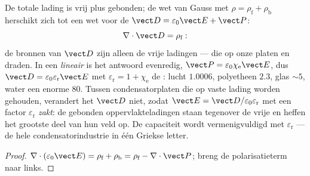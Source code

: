 \begin{proposition}\label{prop:b3:electromagnetism-in-matter:displacement}
De totale lading is vrij plus gebonden; de wet van Gauss met $\rho =
\rho_{\text{f}} + \rho_{\text{b}}$ herschikt zich tot een wet voor de
\emph{} $\vect D = \varepsilon_0\vect E +
\vect P$:
\[
\nabla\cdot\vect D = \rho_{\text{f}} :
\]
de bronnen van $\vect D$ zijn alleen de vrije ladingen --- die op onze
platen en draden. In een \emph{lineair}  is het antwoord
evenredig, $\vect P = \varepsilon_0\chi_{\text{e}}\vect E$, dus
$\vect D = \varepsilon_0\varepsilon_{\text{r}}\vect E$ met
$\varepsilon_{\text{r}} = 1 + \chi_{\text{e}}$ de \emph{}: lucht $1.0006$, polyetheen $2.3$, glas $\sim 5$,
water een enorme $80$. Tussen condensatorplaten die op vaste lading
worden gehouden, verandert het  $\vect D$ niet, zodat $\vect E =
\vect D/\varepsilon_0\varepsilon_{\text{r}}$ met een factor
$\varepsilon_{\text{r}}$ \emph{zakt}: de gebonden oppervlakteladingen staan tegenover
de vrije en heffen het grootste deel van hun veld op. De capaciteit wordt vermenigvuldigd met
$\varepsilon_{\text{r}}$ --- de hele condensatorindustrie in één
Griekse letter.
\end{proposition}

\begin{proof}
$\nabla\cdot(\varepsilon_0\vect E) = \rho_{\text{f}} +
\rho_{\text{b}} = \rho_{\text{f}} - \nabla\cdot\vect P$; breng de
polarisatieterm naar links.
\end{proof}

